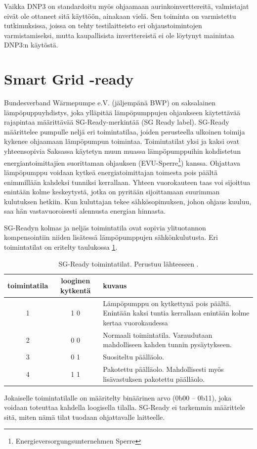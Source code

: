   Vaikka DNP3 on standardoitu myös ohjaamaan aurinkoinverttereitä, valmistajat eivät ole ottaneet sitä käyttöön, ainakaan vielä. Sen toiminta on varmistettu tutkimuksissa, joissa on tehty testilaitteisto eri ohjaustoimintojen varmistamiseksi, mutta kaupallisista inverttereistä ei ole löytynyt mainintaa DNP3:n käytöstä. \parencite{DNP3Inv}


\section{Smart Grid -ready}

  Bundesverband Wärmepumpe e.V. (jäljempänä BWP) on saksalainen lämpöpuppuyhdistys, joka ylläpitää lämpöpumppujen ohjaukseen käytettävää rajapintaa määrittävää \gls{SG}-Ready-merkintää (\gls{SG} Ready label). \gls{SG}-Ready määrittelee pumpulle neljä eri toimintatilaa, joiden perusteella ulkoinen toimija kykenee ohjaamaan lämpöpumpun toimintaa. Toimintatilat yksi ja kaksi ovat yhteensopivia Saksassa käytetyn muun muassa lämpöpumppuihin kohdistetun energiantoimittajien suorittaman ohjauksen (EVU-Sperre\footnote{Energieversorgungsunternehmen Sperre}) kanssa.\parencite{SGReadyReg} Ohjattava lämpöpumppu voidaan kytkeä energiatoimittajan toimesta pois päältä enimmillään kahdeksi tunniksi kerrallaan. Yhteen vuorokauteen taas voi sijoittua enintään kolme keskeytystä, jotka on pyritään sijoittamaan suurimman kulutuksen hetkiin. Kun kuluttajan tekee sähkösopimuksen, johon ohjaus kuuluu, saa hän vastavuoroisesti alennusta energian hinnasta. \parencite{enwg, VDEARN4100}

  SG-Readyn  kolmas ja neljäs toimintatila ovat sopivia ylituotannon kompensointiin niiden lisätessä lämpöpumppujen sähkönkulutusta. Eri toimintatilat on eritelty taulukossa \ref{sgready}.
  \begin{table}[h]
    \centering
    \caption[\gls{SG}-Ready toimintatilat]{\gls{SG}-Ready toimintatilat. Perustuu lähteeseen \parencite{SGReadyReg}.}
    \begin{tabular}{|c|c|p{3in}|}
      \hline
      \rowcolor{lightgray} toimintatila & looginen kytkentä & kuvaus \\\hline
      1 & 1 0 & Lämpöpumppu on kytkettynä pois päältä. Enintään kaksi tuntia kerrallaan enintään kolme kertaa vuorokaudessa \\\hline
      2 & 0 0 & Normaali toimintatila. Varaudutaan mahdolliseen kahden tunnin pysäytykseen. \\\hline
      3 & 0 1 & Suositeltu päälläolo. \\ \hline
      4 & 1 1 & Pakotettu päälläolo. Mahdollisesti myös lisävastuksen pakotettu päälläolo. \\\hline
    \end{tabular}
    \label{sgready}
  \end{table}
  Jokaiselle toimintatilalle on määritelty binäärinen arvo (0b00 -- 0b11), joka voidaan toteuttaa kahdella loogisella tilalla. SG-Ready ei tarkemmin määrittele sitä, miten nämä tilat tuodaan ohjattavalle laitteelle. \parencite{SGReadyReg}

